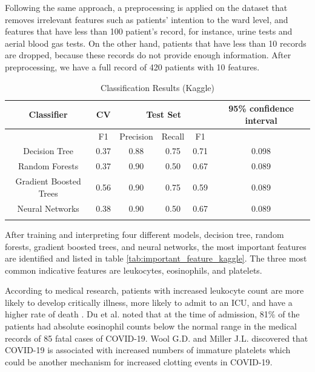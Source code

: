 Following the same approach, a preprocessing is applied on the dataset that removes irrelevant features such as patients' intention to the ward level, and features that have less than 100 patient's record, for instance, urine tests and aerial blood gas tests. On the other hand, patients that have less than 10 records are dropped, because these records do not provide enough information. After preprocessing, we have a full record of 420 patients with 10 features.
\color{black}

\begin{table}[H]
\centering
\begin{tabular}{cccccc}
\toprule
Classifier    & CV & \multicolumn{3}{c}{Test Set} & 95\% confidence interval \\ \midrule
              & F1               & Precision  & Recall  & F1    &\\
Decision Tree & 0.37             & 0.88       & 0.75    & 0.71  & 0.098\\
Random Forests & 0.37             & 0.90       & 0.50    & 0.67  & 0.089\\
Gradient Boosted Trees  & 0.56    & 0.90       & 0.75    & 0.59 & 0.089\\
Neural Networks       & 0.38             & 0.90       & 0.50    & 0.67 & 0.089\\ \bottomrule
\label{tab:kaggle_models}
\end{tabular}
\caption{Classification Results (Kaggle)}
\end{table}

After training and interpreting four different models, decision tree, random forests, gradient boosted trees, and neural networks, the most important features are identified and listed in table \ref{tab:important_feature_kaggle}. The three most common indicative features are leukocytes, eosinophils, and platelets.

According to medical research, patients with increased leukocyte count are more likely to develop critically illness, more likely to admit to an ICU, and have a higher rate of death \citep{zhao2020clinical}. Du et al. noted that at the time of admission, 81\% of the patients had absolute eosinophil counts below the normal range in the medical records of 85 fatal cases of COVID-19\citep{du2020clinical}. Wool G.D. and Miller J.L. discovered that COVID-19 is associated with increased numbers of immature platelets which could be another mechanism for increased clotting events in COVID-19\citep{wool2021impact}.

